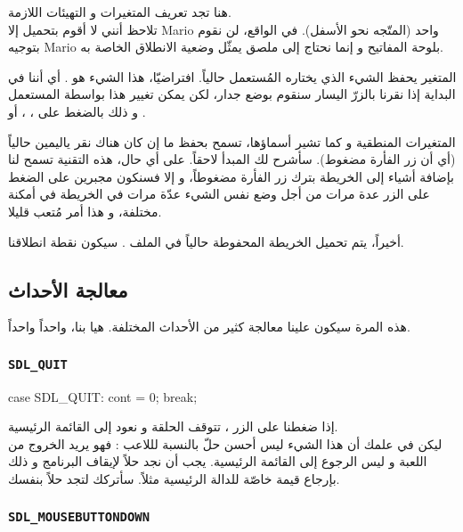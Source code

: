 هنا تجد تعريف المتغيرات و التهيئات اللازمة.\\
تلاحظ أنني لا أقوم بتحميل إلا 
\textenglish{Mario}
واحد (المتّجه نحو الأسفل). في الواقع، لن نقوم بتوجيه
\textenglish{Mario}
بلوحة المفاتيح و إنما نحتاج إلى ملصق يمثّل وضعية الانطلاق الخاصة به.

المتغير
يحفظ الشيء الذي يختاره المُستعمل حالياً. افتراضيّا، هذا الشيء هو
.
 أي أننا في البداية إذا نقرنا بالزرّ اليسار سنقوم بوضع جدار، لكن يمكن تغيير هذا بواسطة المستعمل و ذلك بالضغط على 
، ، 
 أو
.

المتغيرات المنطقية
و
كما تشير أسماؤها، تسمح بحفظ ما إن كان هناك نقر ياليمين حالياً (أي أن زر الفأرة مضغوط). سأشرح لك المبدأ لاحقاً. على أي حال، هذه التقنية تسمح لنا بإضافة أشياء إلى الخريطة بترك زر الفأرة مضغوطاً، و إلا فسنكون مجبرين على الضغط على الزر عدة مرات من أجل وضع نفس الشيء عدّة مرات في الخريطة في أمكنة مختلفة، و هذا أمر مُتعب قليلا.

أخيراً، يتم تحميل الخريطة المحفوطة حالياً في الملف
.
سيكون نقطة انطلاقنا.

\subsection{معالجة الأحداث}

هذه المرة سيكون علينا معالجة كثير من الأحداث المختلفة. هيا بنا، واحداً واحداً.

\subsubsection{\texttt{SDL\_QUIT}}

\begin{Csource}
case SDL_QUIT:
cont = 0;
break;
\end{Csource}

إذا ضغطنا على الزر
،
تتوقف الحلقة و نعود إلى القائمة الرئيسية.\\
ليكن في علمك أن هذا الشيء ليس أحسن حلّ بالنسبة لللاعب : فهو يريد الخروج من اللعبة و ليس الرجوع إلى القائمة الرئيسية. يجب أن نجد حلاً لإيقاف البرنامج و ذلك بإرجاع قيمة خاصّة للدالة الرئيسية مثلاً. سأتركك لتجد حلاً بنفسك.

\subsubsection{\texttt{SDL\_MOUSEBUTTONDOWN}}

